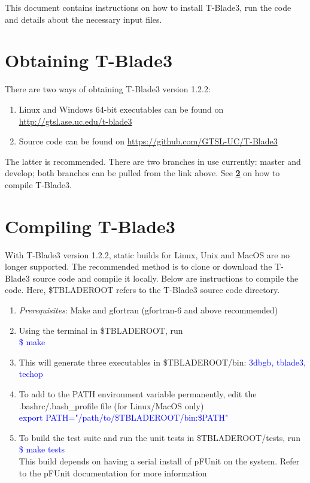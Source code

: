 \documentclass[8pt]{article}
\begin{document}
\noindent
This document contains instructions on how to install T-Blade3, run the code and details about the necessary input files.

\section{Obtaining T-Blade3}
\noindent 
There are two ways of obtaining T-Blade3 version 1.2.2:
 
\begin{enumerate}[leftmargin=*]
    \item Linux and Windows 64-bit executables can be found on \url{http://gtsl.ase.uc.edu/t-blade3}
    \item Source code can be found on \url{https://github.com/GTSL-UC/T-Blade3}
\end{enumerate}

\noindent
The latter is recommended. There are two branches in use currently: {\selectfont master} and {\selectfont develop}; both branches can be pulled from the link above. See \textbf{\ref{compilesec}} on how to compile T-Blade3.

\section{Compiling T-Blade3}\label{compilesec}
\noindent
With T-Blade3 version 1.2.2, static builds for Linux, Unix and MacOS are no longer supported. The recommended method is to clone or download the T-Blade3 source code and compile it locally. Below are instructions to compile the code. Here, \$TBLADEROOT refers to the T-Blade3 source code directory. 

\begin{enumerate}[leftmargin=*]
    \item \textit{Prerequisites}: Make and gfortran (gfortran-6 and above recommended)
    \item Using the terminal in \$TBLADEROOT, run\\
          \textcolor{blue}{\selectfont \$ make}
    \item This will generate three executables in \$TBLADEROOT/bin: \textcolor{blue}{\selectfont 3dbgb, tblade3, techop}
    \item To add to the PATH environment variable permanently, edit the .bashrc/.bash\_profile file (for Linux/MacOS only)\\
          \textcolor{blue}{\selectfont export PATH="/path/to/\$TBLADEROOT/bin:\$PATH"}
    \item To build the test suite and run the unit tests in \$TBLADEROOT/tests, run\\
          \textcolor{blue}{\selectfont \$ make tests}\\
          This build depends on having a serial install of pFUnit on the system. Refer to the pFUnit documentation for more information
\end{enumerate}
\end{document}
